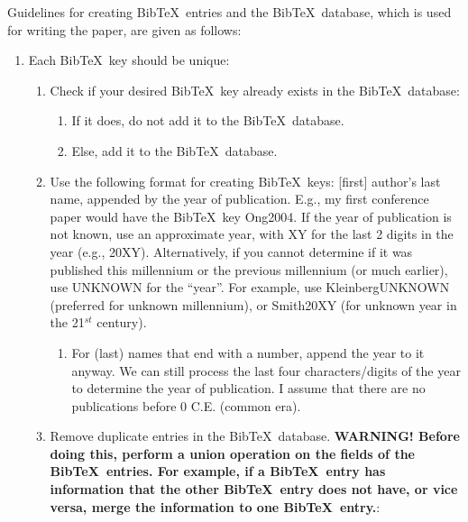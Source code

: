 \documentclass[letter,12pt]{article}
\begin{document}
Guidelines for creating {\sc Bib}\TeX\ entries and the {\sc Bib}\TeX\ database, which is used for writing the paper, are given as follows: \vspace{-0.2cm}
\begin{enumerate} \itemsep -2pt
\item Each {\sc Bib}\TeX\ key should be unique: \vspace{-0.3cm}
	\begin{enumerate} \itemsep -2pt
	\item Check if your desired {\sc Bib}\TeX\ key already exists in the {\sc Bib}\TeX\ database: \vspace{-0.1cm}
		\begin{enumerate} %
		\item If it does, do not add it to the  {\sc Bib}\TeX\ database.
		\item Else, add it to the  {\sc Bib}\TeX\ database.
		\end{enumerate}
	\item Use the following format for creating {\sc Bib}\TeX\ keys: [first] author's last name, appended by the year of publication. E.g., my first conference paper would have the {\sc Bib}\TeX\ key Ong2004. If the year of publication is not known, use an approximate year, with XY for the last 2 digits in the year (e.g., 20XY). Alternatively, if you cannot determine if it was published this millennium or the previous millennium (or much earlier), use UNKNOWN for the ``year''. For example, use KleinbergUNKNOWN (preferred for unknown millennium), or Smith20XY (for unknown year in the 21$^{st}$ century). \vspace{-0.2cm}
		\begin{enumerate} \itemsep -2pt
		\item For (last) names that end with a number, append the year to it anyway. We can still process the last four characters/digits of the year to determine the year of publication. I assume that there are no publications before 0 C.E. (common era).
		\end{enumerate}
	\item Remove duplicate entries in the {\sc Bib}\TeX\ database. {\bf WARNING! Before doing this, perform a union operation on the fields of the {\sc Bib}\TeX\ entries. For example, if a {\sc Bib}\TeX\ entry has information that the other {\sc Bib}\TeX\ entry does not have, or vice versa, merge the information to one {\sc Bib}\TeX\ entry.}: \vspace{-0.2cm}
		\begin{enumerate} \itemsep -2pt

\end{enumerate}
\end{enumerate}
\end{enumerate}
\end{document}
